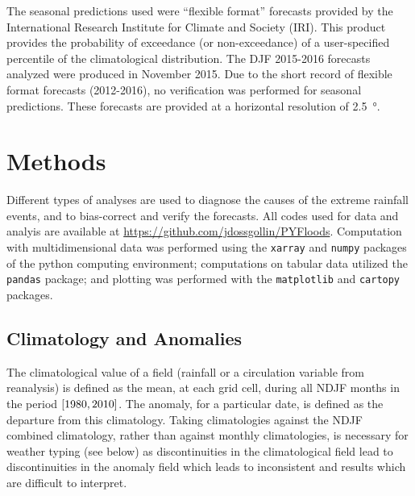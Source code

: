\documentclass[twocol]{ametsoc}
\begin{document}
The seasonal predictions used were ``flexible format'' forecasts provided by the International Research Institute for Climate and Society (IRI).
This product provides the probability of exceedance (or non-exceedance) of a user-specified percentile of the climatological distribution.
The DJF 2015-2016 forecasts analyzed were produced in November 2015.
Due to the short record of flexible format forecasts (2012-2016), no verification was performed for seasonal predictions.
These forecasts are provided at a horizontal resolution of \SI{2.5}{\degree}.



\section{Methods} \label{sec:methods}

Different types of analyses are used to diagnose the causes of the extreme rainfall events, and to bias-correct and verify the forecasts.
All codes used for data and analyis are available at \url{https://github.com/jdossgollin/PYFloods}.
Computation with multidimensional data was performed using the \texttt{xarray} \citep{hoyer2017xarray} and \texttt{numpy} \citep{vanderWalt:2011dp} packages of the python computing environment; computations on tabular data utilized the \texttt{pandas} \citep{McKinney:2010un} package; and plotting was performed with the \texttt{matplotlib} \citep{Hunter:2007ux} and \texttt{cartopy} \citep{Cartopy} packages.

\subsection{Climatology and Anomalies} \label{sec:climatology-anomalies}

The climatological value of a field (rainfall or a circulation variable from reanalysis) is defined as the mean, at each grid cell, during all NDJF months in the period $\qty[1980, 2010]$.
The anomaly, for a particular date, is defined as the departure from this climatology.
Taking climatologies against the NDJF combined climatology, rather than against monthly climatologies, is necessary for weather typing (see below) as discontinuities in the climatological field lead to discontinuities in the anomaly field which leads to inconsistent and results which are difficult to interpret.
\end{document}
